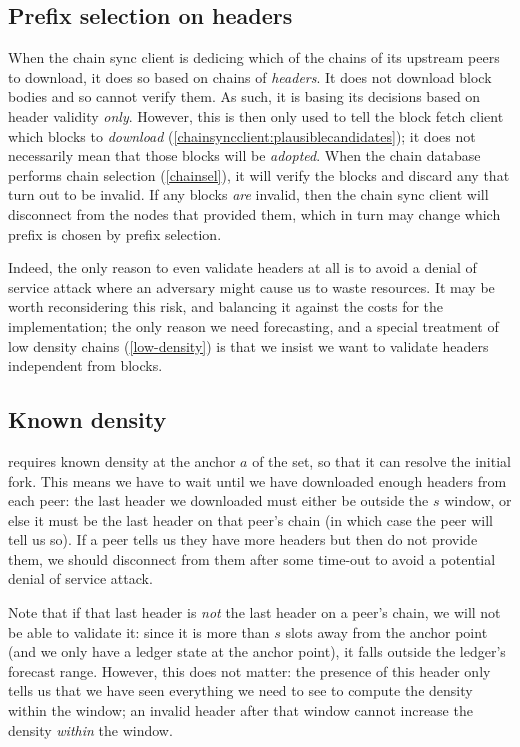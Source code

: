 \subsection{Prefix selection on headers}

When the chain sync client is dedicing which of the chains of its upstream peers
to download, it does so based on chains of \emph{headers}. It does not download
block bodies and so cannot verify them. As such, it is basing its decisions
based on header validity \emph{only}.  However, this is then only used to tell
the block fetch client which blocks to \emph{download}
(\cref{chainsyncclient:plausiblecandidates}); it does not necessarily mean that
those blocks will be \emph{adopted}. When the chain database performs chain
selection (\cref{chainsel}), it will verify the blocks and discard any that turn
out to be invalid. If any blocks \emph{are} invalid, then the chain sync client
will disconnect from the nodes that provided them, which in turn may change
which prefix is chosen by prefix selection.

Indeed, the only reason to even validate headers at all is to avoid a denial
of service attack where an adversary might cause us to waste resources.
It may be worth reconsidering this risk, and balancing it against the costs
for the implementation; the only reason we need forecasting, and a special
treatment of low density chains (\cref{low-density}) is that we insist we want
to validate headers independent from blocks.

\subsection{Known density}

 requires known density at the anchor $a$ of the set, so
that it can resolve the initial fork. This means we have to wait until
we have downloaded enough headers from each peer: the last header we downloaded
must either be outside the $s$ window, or else it must be the last header on that
peer's chain (in which case the peer will tell us so). If a peer tells us they have
more headers but then do not provide them, we should disconnect from them
after some time-out to avoid a potential denial of service attack.

Note that if that last header is \emph{not} the last header on a peer's chain,
we will not be able to validate it: since it is more than $s$ slots away from
the anchor point (and we only have a ledger state at the anchor point), it falls
outside the ledger's forecast range. However, this does not matter: the presence
of this header only tells us that we have seen everything we need to see to
compute the density within the window; an invalid header after that window
cannot increase the density \emph{within} the window.

